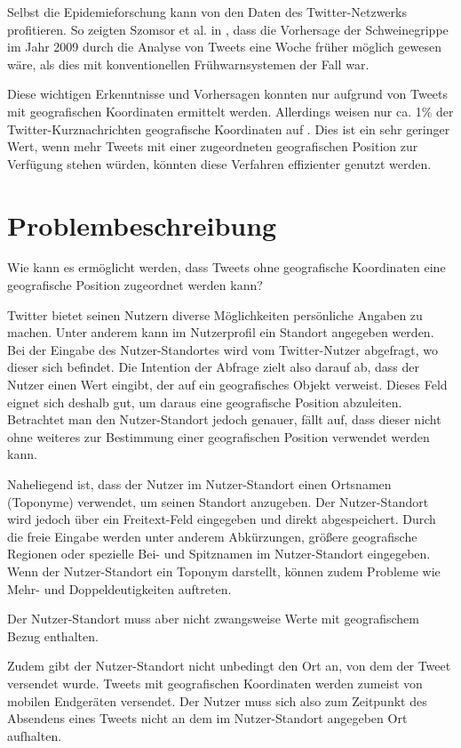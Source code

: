 		Selbst die Epidemieforschung kann von den Daten des Twitter-Netzwerks profitieren. 
		So zeigten Szomsor et al. in \cite{Szomszor2011}, dass die Vorhersage der Schweinegrippe im Jahr 2009 durch die Analyse von Tweets eine Woche früher möglich gewesen wäre, als dies mit konventionellen Frühwarnsystemen der Fall war. 

 		Diese wichtigen Erkenntnisse und Vorhersagen konnten nur aufgrund von Tweets mit geografischen Koordinaten ermittelt werden.
 		Allerdings weisen nur ca. 1\% der Twitter-Kurznachrichten geografische Koordinaten auf \cite{Schulz2013}.
 		Dies ist ein sehr geringer Wert, wenn mehr Tweets mit einer zugeordneten geografischen Position zur Verfügung stehen würden, könnten diese Verfahren effizienter genutzt werden.
 		
	\section{Problembeschreibung} 

 		Wie kann es ermöglicht werden, dass Tweets ohne geografische Koordinaten eine geografische Position zugeordnet werden kann?

 		Twitter bietet seinen Nutzern diverse Möglichkeiten persönliche Angaben zu machen.
		Unter anderem kann im Nutzerprofil ein Standort angegeben werden. 
		Bei der Eingabe des Nutzer-Standortes wird vom Twitter-Nutzer abgefragt, wo dieser sich befindet. 
		Die Intention der Abfrage zielt also darauf ab, dass der Nutzer einen Wert eingibt, der auf ein geografisches Objekt verweist. 
		Dieses Feld eignet sich deshalb gut, um daraus eine geografische Position abzuleiten.
		Betrachtet man den Nutzer-Standort jedoch genauer, fällt auf, dass dieser nicht ohne weiteres zur Bestimmung einer geografischen Position verwendet werden kann.
		
		Naheliegend ist, dass der Nutzer im Nutzer-Standort einen Ortsnamen (Toponyme) verwendet, um seinen Standort anzugeben.
		Der Nutzer-Standort wird jedoch über ein Freitext-Feld eingegeben und direkt abgespeichert.
		Durch die freie Eingabe werden unter anderem Abkürzungen, größere geografische Regionen oder spezielle Bei- und Spitznamen im Nutzer-Standort eingegeben. 
		Wenn der Nutzer-Standort ein Toponym darstellt, können zudem Probleme wie Mehr- und Doppeldeutigkeiten auftreten.

		Der Nutzer-Standort muss aber nicht zwangsweise Werte mit geografischem Bezug enthalten. 

		Zudem gibt der Nutzer-Standort nicht unbedingt den Ort an, von dem der Tweet versendet wurde. 
		Tweets mit geografischen Koordinaten werden zumeist von mobilen Endgeräten versendet. 
		Der Nutzer muss sich also zum Zeitpunkt des Absendens eines Tweets nicht an dem im Nutzer-Standort angegeben Ort aufhalten.

